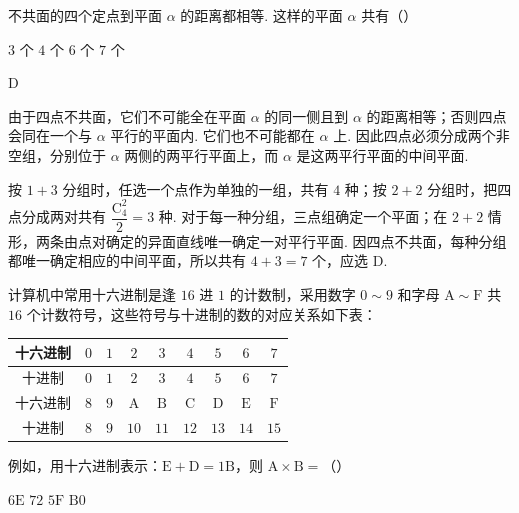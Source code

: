 \begin{problem}
不共面的四个定点到平面 \(\alpha\) 的距离都相等. 这样的平面 \(\alpha\) 共有（\quad）

\choices
    {\(3\text{ 个}\)}
    {\(4\text{ 个}\)}
    {\(6\text{ 个}\)}
    {\(7\text{ 个}\)}
\end{problem}

\begin{answer}
D
\end{answer}

\begin{solution}
由于四点不共面，它们不可能全在平面 \(\alpha\) 的同一侧且到 \(\alpha\) 的距离相等；否则四点会同在一个与 \(\alpha\) 平行的平面内. 它们也不可能都在 \(\alpha\) 上. 因此四点必须分成两个非空组，分别位于 \(\alpha\) 两侧的两平行平面上，而 \(\alpha\) 是这两平行平面的中间平面.

按 \(1+3\) 分组时，任选一个点作为单独的一组，共有 \(4\) 种；按 \(2+2\) 分组时，把四点分成两对共有 \(\dfrac{\mathrm C_4^2}{2}=3\) 种. 对于每一种分组，三点组确定一个平面；在 \(2+2\) 情形，两条由点对确定的异面直线唯一确定一对平行平面. 因四点不共面，每种分组都唯一确定相应的中间平面，所以共有 \(4+3=7\) 个，应选 D.
\end{solution}



\begin{problem}
计算机中常用十六进制是逢 \(16\) 进 \(1\) 的计数制，采用数字 \(0 \sim 9\) 和字母 \(\mathrm{A} \sim \mathrm{F}\) 共 \(16\) 个计数符号，这些符号与十进制的数的对应关系如下表：

\begin{center}
\small
\begin{tabular}{|c|c|c|c|c|c|c|c|c|}
\hline
十六进制 & \(0\) & \(1\) & \(2\) & \(3\) & \(4\) & \(5\) & \(6\) & \(7\) \\
\hline
十进制 & \(0\) & \(1\) & \(2\) & \(3\) & \(4\) & \(5\) & \(6\) & \(7\) \\
\hline
十六进制 & \(8\) & \(9\) & \(\mathrm{A}\) & \(\mathrm{B}\) & \(\mathrm{C}\) & \(\mathrm{D}\) & \(\mathrm{E}\) & \(\mathrm{F}\) \\
\hline
十进制 & \(8\) & \(9\) & \(10\) & \(11\) & \(12\) & \(13\) & \(14\) & \(15\) \\
\hline
\end{tabular}
\end{center}

例如，用十六进制表示：\(\mathrm{E} + \mathrm{D} = 1\mathrm{B}\)，则 \(\mathrm{A} \times \mathrm{B} =\)（\quad）

\choices
    {\(6\mathrm{E}\)}
    {\(72\)}
    {\(5\mathrm{F}\)}
    {\(\mathrm{B}0\)}
\end{problem}

